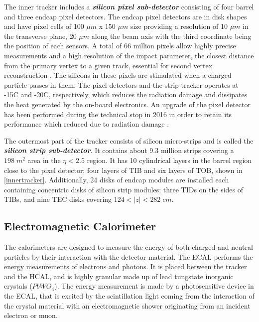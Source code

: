 The inner tracker includes a \textbf{\emph{silicon pixel sub-detector}} consisting of four barrel and three endcap pixel detectors. The endcap pixel detectors are in disk shapes and have pixel cells of 100 $\mu m$ x 150 $\mu m$ size providing a resolution of 10 $\mu m$ in the transverse plane, 20 $\mu m$ along the beam axis with the third coordinate being the position of each sensors. A total of 66 million pixels \cite{innertracker} allow highly precise measurements and a high resolution of the impact parameter, the closest distance from the primary vertex to a given track, essential for second vertex reconstruction \cite{innertracker2}. The silicons in these pixels are stimulated when a charged particle passes in them. The pixel detectors and the strip tracker operates at -15\textdegree C and -20\textdegree C, respectively, which reduces the radiation damage and dissipates the heat generated by the on-board electronics. An upgrade of the pixel detector has been performed during the technical stop in 2016 in order to retain its performance which reduced due to radiation damage \cite{tracker3}.

The outermost part of the tracker consists of silicon micro-strips and is called the \textbf{\emph{silicon strip sub-detector}}. It contains about 9.3 million strips covering a $198\;m^2$ area in the $\eta < 2.5$ region. It has 10 cylindrical layers in the barrel region close to the pixel detector; four layers of TIB and six layers of TOB, shown in \autoref{innertracker}. Additionally, 24 disks of endcap modules are installed each containing concentric disks of silicon strip modules; three TIDs on the sides of TIBs, and nine TEC disks covering $124<|z|<282\;cm$.

\subsection{Electromagnetic Calorimeter}

The calorimeters are designed to measure the energy of both charged and neutral particles by their interaction with the detector material. The ECAL \cite{CERN-LHCC-97-033} performs the energy measurements of electrons and photons. It is placed between the tracker and the HCAL, and is highly granular made up of lead tungstate inorganic crystals ($PbWO_4$). The energy measurement is made by a photosensitive device in the ECAL, that is excited by the scintillation light coming from the interaction of the crystal material with an electromagnetic shower originating from an incident electron or muon.

